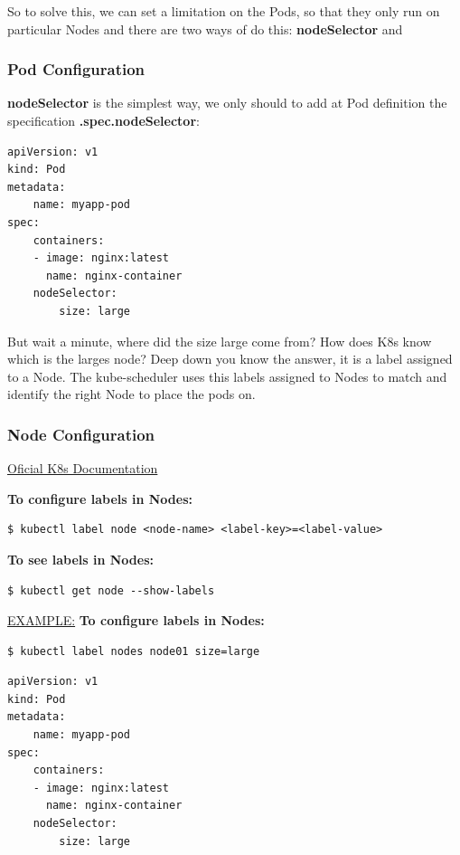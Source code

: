 \documentclass{article}
\newenvironment{codetemplate}[1][]{%
  \mybasecolorbox[#1]
  \itshape
}{%
  \endmybasecolorbox
}
\begin{document}
So to solve this, we can set a limitation on the Pods, so that they only run on particular Nodes and there are two ways of do this: \textbf{nodeSelector} and

\subsubsection{Pod Configuration}
\textbf{nodeSelector} is the simplest way, we only should to add at Pod definition the specification \textbf{.spec.nodeSelector}:

\begin{codetemplate}{}
\begin{verbatim}
apiVersion: v1
kind: Pod
metadata:
    name: myapp-pod
spec:
    containers:
    - image: nginx:latest
      name: nginx-container
    nodeSelector:
        size: large
\end{verbatim}
\end{codetemplate}

But wait a minute, where did the size large come from? How does K8s know which is the larges node? Deep down you know the answer, it is a label assigned to a Node. The kube-scheduler uses this labels assigned to Nodes to match and identify the right Node to place the pods on.

\subsubsection{Node Configuration}

\href{https://kubernetes.io/docs/tasks/configure-pod-container/assign-pods-nodes/}{Oficial K8s Documentation}


\textbf{To configure labels in Nodes:}
\begin{codetemplate}{}
\begin{verbatim}
$ kubectl label node <node-name> <label-key>=<label-value>
\end{verbatim}
\end{codetemplate}

\textbf{To see labels in Nodes:}
\begin{codetemplate}{}
\begin{verbatim}
$ kubectl get node --show-labels
\end{verbatim}
\end{codetemplate}

\underline{EXAMPLE:}
\textbf{To configure labels in Nodes:}
\begin{codetemplate}{}
\begin{verbatim}
$ kubectl label nodes node01 size=large
\end{verbatim}
\begin{codetemplate}{}
\begin{verbatim}
apiVersion: v1
kind: Pod
metadata:
    name: myapp-pod
spec:
    containers:
    - image: nginx:latest
      name: nginx-container
    nodeSelector:
        size: large
\end{verbatim}
\end{codetemplate}

\end{codetemplate}
\end{document}
